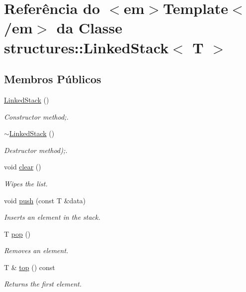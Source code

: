 \hypertarget{classstructures_1_1LinkedStack}{}\section{Referência do $<$em$>$Template$<$/em$>$ da Classe structures\+:\+:Linked\+Stack$<$ T $>$}
\label{classstructures_1_1LinkedStack}
\subsection*{Membros Públicos}
\begin{DoxyCompactItemize}
\item 
\mbox{\hyperlink{classstructures_1_1LinkedStack_a546b827cccaa49b4f470110bc3a9004e}{Linked\+Stack}} ()
\begin{DoxyCompactList}\small\item\em Constructor method;. \end{DoxyCompactList}\item 
\mbox{\hyperlink{classstructures_1_1LinkedStack_aae17566eb103c92eb22be2e779286f2f}{$\sim$\+Linked\+Stack}} ()
\begin{DoxyCompactList}\small\item\em Destructor method);. \end{DoxyCompactList}\item 
void \mbox{\hyperlink{classstructures_1_1LinkedStack_a56cc909b4a3a0ff7a589f35032ca0ba8}{clear}} ()
\begin{DoxyCompactList}\small\item\em Wipes the list. \end{DoxyCompactList}\item 
void \mbox{\hyperlink{classstructures_1_1LinkedStack_adb8c6b231298ac25b17ba692d510a3fc}{push}} (const T \&data)
\begin{DoxyCompactList}\small\item\em Inserts an element in the stack. \end{DoxyCompactList}\item 
T \mbox{\hyperlink{classstructures_1_1LinkedStack_a8ff0ba0de594ec26971bb259e1d28c3c}{pop}} ()
\begin{DoxyCompactList}\small\item\em Removes an element. \end{DoxyCompactList}\item 
T \& \mbox{\hyperlink{classstructures_1_1LinkedStack_a14ab6e3507dd1206a87bba8c57e1733f}{top}} () const
\begin{DoxyCompactList}\small\item\em Returns the first element. \end{DoxyCompactList}\item 

\end{DoxyCompactItemize}

